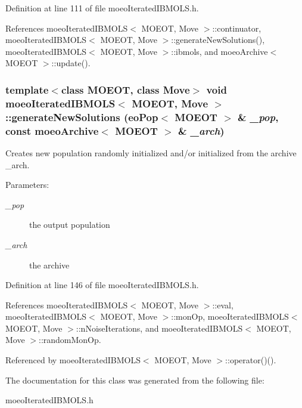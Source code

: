 Definition at line 111 of file moeo\-Iterated\-IBMOLS.h.

References moeo\-Iterated\-IBMOLS$<$ MOEOT, Move $>$::continuator, moeo\-Iterated\-IBMOLS$<$ MOEOT, Move $>$::generate\-New\-Solutions(), moeo\-Iterated\-IBMOLS$<$ MOEOT, Move $>$::ibmols, and moeo\-Archive$<$ MOEOT $>$::update().
\subsubsection{\setlength{\rightskip}{0pt plus 5cm}template$<$class MOEOT, class Move$>$ void \bf{moeo\-Iterated\-IBMOLS}$<$ MOEOT, Move $>$::generate\-New\-Solutions (eo\-Pop$<$ MOEOT $>$ \& {\em \_\-pop}, const \bf{moeo\-Archive}$<$ MOEOT $>$ \& {\em \_\-arch})\hspace{0.3cm}{\tt  [inline, private]}}\label{classmoeoIteratedIBMOLS_2826cf283f6670b3c46da5ac6b6def18}


Creates new population randomly initialized and/or initialized from the archive \_\-arch. 

\begin{Desc}
\item[Parameters:]
\begin{description}
\item[{\em \_\-pop}]the output population \item[{\em \_\-arch}]the archive \end{description}
\end{Desc}


Definition at line 146 of file moeo\-Iterated\-IBMOLS.h.

References moeo\-Iterated\-IBMOLS$<$ MOEOT, Move $>$::eval, moeo\-Iterated\-IBMOLS$<$ MOEOT, Move $>$::mon\-Op, moeo\-Iterated\-IBMOLS$<$ MOEOT, Move $>$::n\-Noise\-Iterations, and moeo\-Iterated\-IBMOLS$<$ MOEOT, Move $>$::random\-Mon\-Op.

Referenced by moeo\-Iterated\-IBMOLS$<$ MOEOT, Move $>$::operator()().

The documentation for this class was generated from the following file:\begin{CompactItemize}
\item 
moeo\-Iterated\-IBMOLS.h\end{CompactItemize}
